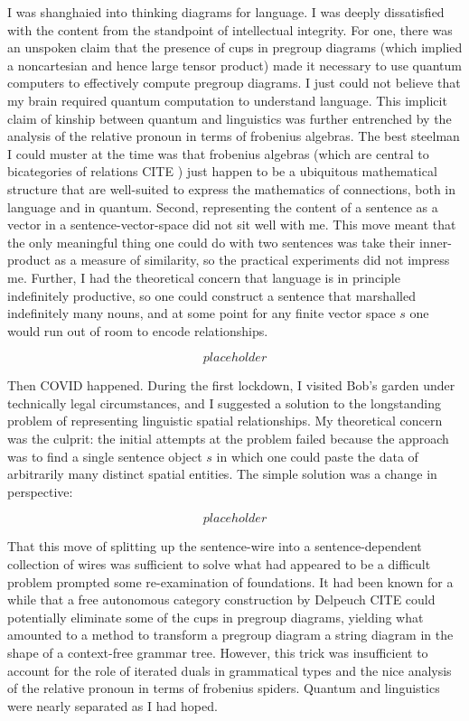 \begin{fullwidth}
I was shanghaied into thinking diagrams for language. I was deeply dissatisfied with the content from the standpoint of intellectual integrity. For one, there was an unspoken claim that the presence of cups in pregroup diagrams (which implied a noncartesian and hence large tensor product) made it necessary to use quantum computers to effectively compute pregroup diagrams. I just could not believe that my brain required quantum computation to understand language. This implicit claim of kinship between quantum and linguistics was further entrenched by the analysis of the relative pronoun in terms of frobenius algebras. The best steelman I could muster at the time was that frobenius algebras (which are central to bicategories of relations \bR CITE \e) just happen to be a ubiquitous mathematical structure that are well-suited to express the mathematics of connections, both in language and in quantum. Second, representing the content of a sentence as a vector in a sentence-vector-space did not sit well with me. This move meant that the only meaningful thing one could do with two sentences was take their inner-product as a measure of similarity, so the practical experiments did not impress me. Further, I had the theoretical concern that language is in principle indefinitely productive, so one could construct a sentence that marshalled indefinitely many nouns, and at some point for any finite vector space $s$ one would run out of room to encode relationships.

\[placeholder\]

Then COVID happened. During the first lockdown, I visited Bob's garden under technically legal circumstances, and I suggested a solution to the longstanding problem of representing linguistic spatial relationships. My theoretical concern was the culprit: the initial attempts at the problem failed because the approach was to find a single sentence object $s$ in which one could paste the data of arbitrarily many distinct spatial entities. The simple solution was a change in perspective:

\[placeholder\]

That this move of splitting up the sentence-wire into a sentence-dependent collection of wires was sufficient to solve what had appeared to be a difficult problem prompted some re-examination of foundations. It had been known for a while that a free autonomous category construction by Delpeuch \bR CITE \e could potentially eliminate some of the cups in pregroup diagrams, yielding what amounted to a method to transform a pregroup diagram a string diagram in the shape of a context-free grammar tree. However, this trick was insufficient to account for the role of iterated duals in grammatical types and the nice analysis of the relative pronoun in terms of frobenius spiders. Quantum and linguistics were nearly separated as I had hoped.


\end{fullwidth}
